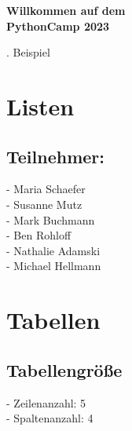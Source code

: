 \documentclass[a4paper]{article}
\title{}
\author{}
\date{2023-06-24}
\newcommand{\name}{PythonCamp 2023}
\newcommand{\BeispielCommand}{5. Beispiel}
\begin{document}
	
	
	\begin{figure}
		\vspace*{\dimexpr+1cm-\topmargin-\headsep-\headheight-\baselineskip}%
		\hspace*{\dimexpr-1cm-\evensidemargin-\parindent}%
	\end{figure}
	\vspace*{-1cm}
	
	\bigskip
	
	{\centering \bfseries \huge Willkommen auf dem \\ \name \par}

	\bigskip
	{\centering \BeispielCommand \par}

	\bigskip
	\section{Listen}
	
	\subsection{Teilnehmer:}
		 - Maria Schaefer \\
  		 - Susanne Mutz \\
  		 - Mark Buchmann \\
  		 - Ben Rohloff \\
  		 - Nathalie Adamski \\
  		 - Michael Hellmann \\
  	
	\section{Tabellen}

	\subsection{Tabellengröße}

	- Zeilenanzahl: 5 \\
	- Spaltenanzahl: 4 \\
\end{document}

